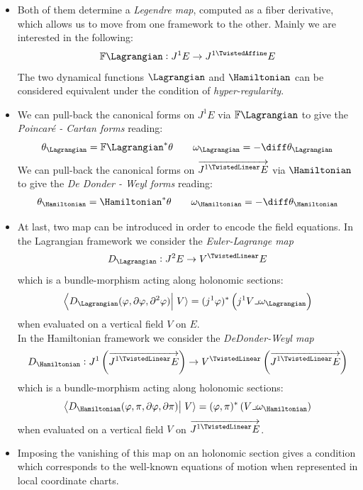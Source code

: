 \documentclass[a4paper,12pt,fleqn]{scrartcl}  %
\renewcommand{\AffDualJet}{ J^{1 \TwistedAffine}E }
\renewcommand{\LinDualJet}{ \overrightarrow{J^{1 \TwistedLinear}E} }
\begin{document}
\begin{itemize}
\item Both of them determine a \emph{Legendre map}, computed as a fiber derivative, which allows us to move from one framework to the other.
	Mainly we are interested  in the following:
	\begin{displaymath}
		\mathbb{F} \Lagrangian : J^1 E \rightarrow \AffDualJet		
	\end{displaymath}
	The two dynamical functions $\Lagrangian$ and $\Hamiltonian$ can be considered equivalent under the condition of \emph{hyper-regularity}\cite{Gimmsy}.

\item We can pull-back the canonical forms on $J^1 E$ via $\mathbb{F} \Lagrangian$ to give the \emph{Poincaré - Cartan forms} reading:
	\begin{displaymath}
		\theta_\Lagrangian = \mathbb{F} \Lagrangian^\ast \theta 
		\qquad 
		\omega_\Lagrangian = - \diff \theta_\Lagrangian
	\end{displaymath}
	We can pull-back the canonical forms on $\LinDualJet$ via $\Hamiltonian$ to give the \emph{De Donder - Weyl forms} reading:
	\begin{displaymath}
		\theta_\Hamiltonian = \Hamiltonian^\ast \theta 
		\qquad 
		\omega_\Hamiltonian = - \diff \theta_\Hamiltonian
	\end{displaymath}
	
\item At last, two map can be introduced in order to encode the field equations.
	In the Lagrangian framework we consider the \emph{Euler-Lagrange map}
	\begin{displaymath}
		D_\Lagrangian : J^2 E \rightarrow V^\TwistedLinear E
	\end{displaymath}
	 which is a bundle-morphism acting along holonomic sections:
	\begin{displaymath}
		\left\langle D_\Lagrangian(\varphi, \partial \varphi , \partial^2 \varphi) \right\vert \left. V \right\rangle = (j^1 \varphi)^\ast \left( j^1V \lrcorner \omega_\Lagrangian \right)
	\end{displaymath}
	 when evaluated on a vertical field $V$ on $E$.\\
	In the Hamiltonian framework we consider the \emph{DeDonder-Weyl map}
	\begin{displaymath}
		D_\Hamiltonian : J^1\left(\LinDualJet \right) \rightarrow V^\TwistedLinear \left(\LinDualJet \right)
	\end{displaymath}
	which is a bundle-morphism acting along holonomic sections:
	\begin{displaymath}
		\left\langle D_\Hamiltonian(\varphi, \pi, \partial \varphi , \partial \pi) \right\vert \left. V \right\rangle = (\varphi, \pi)^\ast \left( V \lrcorner \omega_\Hamiltonian \right)
	\end{displaymath}	
	when evaluated on a vertical field $V$ on $\LinDualJet$.
	
\item	
	Imposing the vanishing of this map on an holonomic section gives a condition which corresponds to the well-known equations of motion when represented in local coordinate charts.

\end{itemize}
\end{document}
